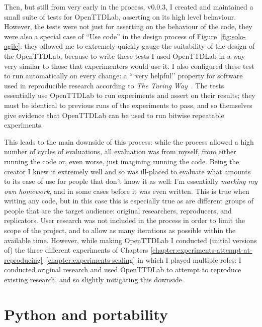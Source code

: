 \documentclass[logo,msc,dsti]{style/infthesis}    %
\begin{document}
{Then, but still from very early in the process, v0.0.3, I created and maintained a small suite of tests for OpenTTDLab, asserting on its high level behaviour. However, the tests were not just for asserting on the behaviour of the code, they were also a special case of ``Use code'' in the design process of Figure~\ref{fig:solo-agile}: they allowed me to extremely quickly gauge the suitability of the design of the OpenTTDLab, because to write these tests I used OpenTTDLab in a way very similar to those that experimenters would use it. I also configured these test to run automatically on every change: a ```very helpful'' property for software used in reproducible research according to \emph{The Turing Way}~\cite{turingway2022}. The tests essentially use OpenTTDLab to run experiments and assert on their results; they must be identical to previous runs of the experiments to pass, and so themselves give evidence that OpenTTDLab can be used to run bitwise repeatable experiments.

This leads to the main downside of this process: while the process allowed a high number of cycles of evaluations, all evaluation was from myself, from either running the code or, even worse, just imagining running the code. Being the creator I knew it extremely well and so was ill-placed to evaluate what amounts to its ease of use for people that don't know it as well: I'm essentially \emph{marking my own homework}, and in some cases before it was even written. This is true when writing any code, but in this case this is especially true as are different groups of people that are the target audience: original researchers, reproducers, and replicators. User research was not included in the process in order to limit the scope of the project, and to allow as many iterations as possible within the available time. However, while making OpenTTDLab I conducted (initial versions of) the three different experiments of Chapters \ref{chapter:experiments-attempt-at-reproducing}--\ref{chapter:experiments-scaling} in which I played multiple roles: I conducted original research and used OpenTTDLab to attempt to reproduce existing research, and so slightly mitigating this downside.

\section{Python and portability}


}
\end{document}
